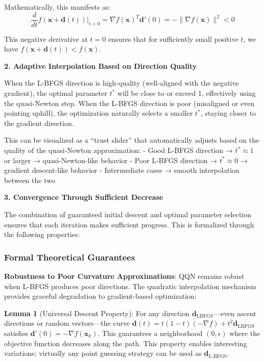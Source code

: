 Mathematically, this manifests as:
\[\frac{d}{dt}f(\mathbf{x} + \mathbf{d}(t))\bigg|_{t=0} = \nabla f(\mathbf{x})^T \mathbf{d}'(0) = -\|\nabla f(\mathbf{x})\|^2 < 0\]

This negative derivative at \(t=0\) ensures that for sufficiently small positive \(t\), we have \(f(\mathbf{x} + \mathbf{d}(t)) < f(\mathbf{x})\).

\textbf{2. Adaptive Interpolation Based on Direction Quality}

When the L-BFGS direction is high-quality (well-aligned with the negative gradient), the optimal parameter \(t^*\) will be close to or exceed 1, effectively using the quasi-Newton step. When the L-BFGS direction is poor (misaligned or even pointing uphill), the optimization naturally selects a smaller \(t^*\), staying closer to the gradient direction.

This can be visualized as a ``trust slider'' that automatically adjusts based on the quality of the quasi-Newton approximation:
- Good L-BFGS direction → \(t^* \approx 1\) or larger → quasi-Newton-like behavior
- Poor L-BFGS direction → \(t^* \approx 0\) → gradient descent-like behavior
- Intermediate cases → smooth interpolation between the two

\textbf{3. Convergence Through Sufficient Decrease}

The combination of guaranteed initial descent and optimal parameter selection ensures that each iteration makes sufficient progress. This is formalized through the following properties:

\hypertarget{formal-theoretical-guarantees}{%
\subsubsection{Formal Theoretical Guarantees}\label{formal-theoretical-guarantees}}

\textbf{Robustness to Poor Curvature Approximations}: QQN remains robust when L-BFGS produces poor directions. The quadratic interpolation mechanism provides graceful degradation to gradient-based optimization:

\textbf{Lemma 1} (Universal Descent Property): For any direction \(\mathbf{d}_{\text{LBFGS}}\)---even ascent directions or random vectors---the curve \(\mathbf{d}(t) = t(1-t)(-\nabla f) + t^2 \mathbf{d}_{\text{LBFGS}}\) satisfies \(\mathbf{d}'(0) = -\nabla f(\mathbf{x}_k)\).
This guarantees a neighborhood \((0, \epsilon)\) where the objective function decreases along the path.
This property enables interesting variations; virtually any point guessing strategy can be used as \(\mathbf{d}_{\text{L-BFGS}}\).

